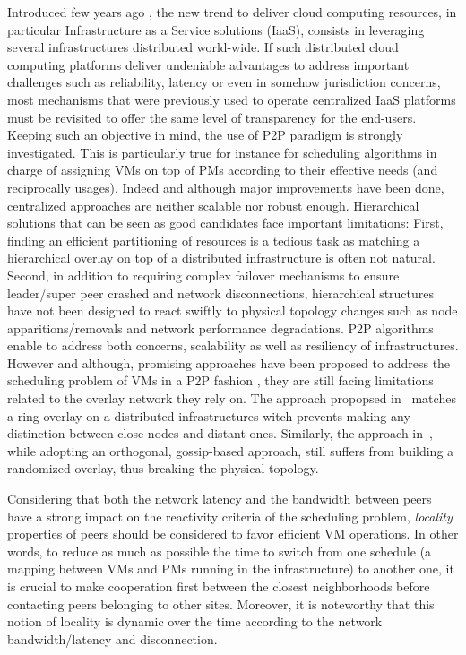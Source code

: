 Introduced few years ago \cite{greenberg:sigcomm09}, the new trend to deliver
cloud computing resources, in particular Infrastructure as a Service solutions
(IaaS), consists in leveraging several infrastructures distributed world-wide.
If such distributed cloud computing platforms deliver undeniable advantages to
address important challenges such as reliability, latency or even in somehow
jurisdiction concerns, most mechanisms that were previously used to operate
centralized IaaS platforms must be revisited to offer the same level of
transparency for the end-users.  Keeping such an objective in mind, the use of
P2P paradigm is strongly investigated. This is particularly true for instance
for scheduling algorithms in charge of assigning VMs on top of PMs according to
their effective needs (and reciprocally usages).  Indeed and although major
improvements have been done, centralized approaches \cite{hermenier:2013} are
neither scalable nor robust enough.  Hierarchical solutions
\cite{feller:ccgrid12} that can be seen as good candidates face important
limitations: First, finding an efficient partitioning of resources is a tedious
task as matching a hierarchical overlay on top of a distributed infrastructure
is often not natural.  Second, in addition to requiring complex failover
mechanisms to ensure leader/super peer crashed and network disconnections,
hierarchical structures have not been designed to react swiftly to physical
topology changes such as node apparitions/removals and network performance
degradations.  P2P algorithms enable to address both concerns, \ie scalability
as well as resiliency of infrastructures. However and although, promising
approaches have been proposed to address the scheduling problem of VMs in a P2P
fashion \cite{quesnel:cpe2012,feller:cloudcom12}, they are still facing
limitations related to the overlay network they rely on. The approach propopsed
in~\cite{quesnel:cpe2012} matches a ring overlay  on a distributed infrastructures
witch prevents making any distinction between close nodes and distant ones.
Similarly, the approach in~\cite{feller:cloudcom12}, while adopting an
orthogonal, gossip-based approach, still suffers from building a randomized
overlay, thus breaking the physical topology.

Considering that both the network latency and the bandwidth between peers have
a strong impact on the reactivity criteria of the scheduling problem,
\emph{locality} properties of peers should be considered to favor efficient VM
operations.  In other words, to reduce as much as possible the time to switch
from one schedule (\ie a mapping between VMs and PMs running in the
infrastructure) to another one, it is crucial to make cooperation first between
the closest neighborhoods before contacting peers belonging to other sites.
Moreover, it is noteworthy that this notion of locality is dynamic over the
time according to the network bandwidth/latency and disconnection.

